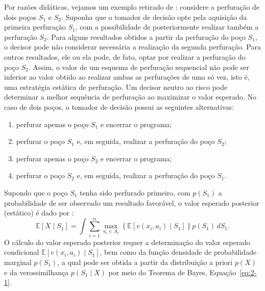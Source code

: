 Por razões didáticas, vejamos um exemplo retirado de \cite{09}: considere a perfuração de dois poços $S_1$ e $S_2$. Suponha que o tomador de decisão opte pela aquisição da primeira perfuração $S_1$, com a possibilidade de posteriormente realizar também a perfuração $S_2$. Para alguns resultados obtidos a partir da perfuração do poço $S_1$, o decisor pode não considerar necessária a realização da segunda perfuração. Para outros resultados, ele ou ela pode, de fato, optar por realizar a perfuração do poço $S_2$. Assim, o valor de um esquema de perfuração sequencial não pode ser inferior ao valor obtido ao realizar ambas as perfurações de uma só vez, isto é, uma estratégia estática de perfuração. Um decisor neutro ao risco pode determinar a melhor sequência de perfuração ao maximizar o valor esperado. No caso de dois poços, o tomador de decisão possui as seguintes alternativas: 

\begin{enumerate}
    \item[\textbullet] perfurar apenas o poço $S_1$ e encerrar o programa;
    \item[\textbullet] perfurar o poço $S_1$ e, em seguida, realizar a perfuração do poço $S_2$;
    \item[\textbullet] perfurar apenas o poço $S_2$ e encerrar o programa;
    \item[\textbullet] perfurar o poço $S_2$ e, em seguida, realizar a perfuração do poço $S_1$.
\end{enumerate}

Supondo que o poço $S_1$ tenha sido perfurado primeiro, com $p(S_1)$ a probabilidade de ser observado um resultado favorável, o valor esperado posterior (estático) é dado por \cite{09}:
\begin{equation}
    \mathbb{E}[X\mid S_1] = \int \sum_{i=1}^{n} \max_{a_i \in A_i} \left\{ \mathbb{E}[ v(x_i,a_i) \mid S_1 ] \right\} p(S_1) \, dS_1.
    \label{eq:2-23}
\end{equation}
O cálculo do valor esperado posterior requer a determinação do valor esperado condicional $\mathbb{E}\!\left[ v(x_i,a_i) \mid S_1 \right]$, bem como da função densidade de probabilidade marginal $p(S_1)$, a qual pode ser obtida a partir da distribuição a priori $p(X)$ e da verossimilhança $p(S_1\mid X)$ por meio do Teorema de Bayes, Equação~\eqref{eq:2-1}. 

